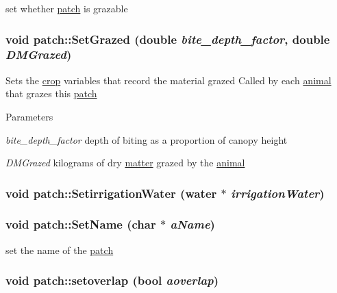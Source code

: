 set whether \hyperlink{classpatch}{patch} is grazable \hypertarget{classpatch_a691aceb2b8472215986518945b3b01d2}{
\subsubsection[{SetGrazed}]{\setlength{\rightskip}{0pt plus 5cm}void patch::SetGrazed (double {\em bite\_\-depth\_\-factor}, \/  double {\em DMGrazed})}}
\label{classpatch_a691aceb2b8472215986518945b3b01d2}
Sets the \hyperlink{classcrop}{crop} variables that record the material grazed Called by each \hyperlink{classanimal}{animal} that grazes this \hyperlink{classpatch}{patch} 
\begin{DoxyParams}{Parameters}
\item[{\em bite\_\-depth\_\-factor}]depth of biting as a proportion of canopy height \item[{\em DMGrazed}]kilograms of dry \hyperlink{classmatter}{matter} grazed by the \hyperlink{classanimal}{animal} \end{DoxyParams}
\hypertarget{classpatch_a545552e8ba7fe79543bac8f9a5a33343}{
\subsubsection[{SetirrigationWater}]{\setlength{\rightskip}{0pt plus 5cm}void patch::SetirrigationWater ({\bf water} $\ast$ {\em irrigationWater})}}
\label{classpatch_a545552e8ba7fe79543bac8f9a5a33343}
\hypertarget{classpatch_aaa76dd5410cb800bd5281d2cc13d5807}{
\subsubsection[{SetName}]{\setlength{\rightskip}{0pt plus 5cm}void patch::SetName (char $\ast$ {\em aName})}}
\label{classpatch_aaa76dd5410cb800bd5281d2cc13d5807}


set the name of the \hyperlink{classpatch}{patch} \hypertarget{classpatch_abceaced850ecf5b133c4e74b70f12d54}{
\subsubsection[{setoverlap}]{\setlength{\rightskip}{0pt plus 5cm}void patch::setoverlap (bool {\em aoverlap})}}
\label{classpatch_abceaced850ecf5b133c4e74b70f12d54}


